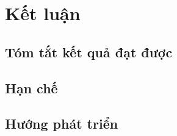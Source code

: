 
\section{Kết luận}
\label{sec:conclusion}

\subsection{Tóm tắt kết quả đạt được}



\subsection{Hạn chế}



\subsection{Hướng phát triển}

